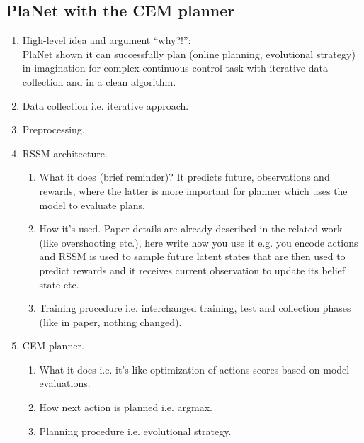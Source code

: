 \subsection{PlaNet with the CEM planner}

\begin{enumerate}
\item High-level idea and argument ``why?!'':\\
  PlaNet shown it can successfully plan (online planning, evolutional strategy) in imagination for complex continuous control task with iterative data collection and in a clean algorithm.
\item Data collection i.e. iterative approach.
\item Preprocessing.
\item RSSM architecture.\\ 
  \begin{enumerate}
  \item What it does (brief reminder)? It predicts future, observations and rewards, where the latter is more important for planner which uses the model to evaluate plans. 
  \item How it's used. Paper details are already described in the related work (like overshooting etc.), here write how you use it e.g. you encode actions and RSSM is used to sample future latent states that are then used to predict rewards and it receives current observation to update its belief state etc.
  \item Training procedure i.e. interchanged training, test and collection phases (like in paper, nothing changed).
  \end{enumerate}
\item CEM planner.
  \begin{enumerate}
  \item What it does i.e. it's like optimization of actions scores based on model evaluations.
  \item How next action is planned i.e. argmax.
  \item Planning procedure i.e. evolutional strategy.
  \end{enumerate}
\end{enumerate}
